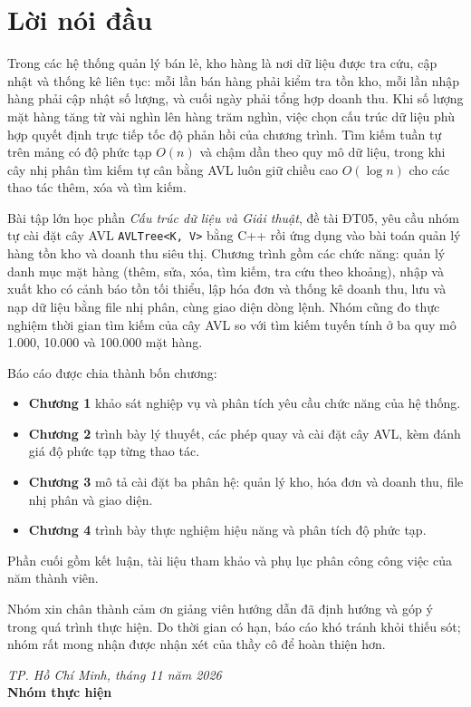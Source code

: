 \chapter*{Lời nói đầu}

Trong các hệ thống quản lý bán lẻ, kho hàng là nơi dữ liệu được tra cứu, cập nhật và thống kê liên tục: mỗi lần bán hàng phải kiểm tra tồn kho, mỗi lần nhập hàng phải cập nhật số lượng, và cuối ngày phải tổng hợp doanh thu. Khi số lượng mặt hàng tăng từ vài nghìn lên hàng trăm nghìn, việc chọn cấu trúc dữ liệu phù hợp quyết định trực tiếp tốc độ phản hồi của chương trình. Tìm kiếm tuần tự trên mảng có độ phức tạp $O(n)$ và chậm dần theo quy mô dữ liệu, trong khi cây nhị phân tìm kiếm tự cân bằng AVL luôn giữ chiều cao $O(\log n)$ cho các thao tác thêm, xóa và tìm kiếm.

Bài tập lớn học phần \textit{Cấu trúc dữ liệu và Giải thuật}, đề tài ĐT05, yêu cầu nhóm tự cài đặt cây AVL \texttt{AVLTree<K, V>} bằng C++ rồi ứng dụng vào bài toán quản lý hàng tồn kho và doanh thu siêu thị. Chương trình gồm các chức năng: quản lý danh mục mặt hàng (thêm, sửa, xóa, tìm kiếm, tra cứu theo khoảng), nhập và xuất kho có cảnh báo tồn tối thiểu, lập hóa đơn và thống kê doanh thu, lưu và nạp dữ liệu bằng file nhị phân, cùng giao diện dòng lệnh. Nhóm cũng đo thực nghiệm thời gian tìm kiếm của cây AVL so với tìm kiếm tuyến tính ở ba quy mô 1.000, 10.000 và 100.000 mặt hàng.

Báo cáo được chia thành bốn chương:
\begin{itemize}
  \item \textbf{Chương 1} khảo sát nghiệp vụ và phân tích yêu cầu chức năng của hệ thống.
  \item \textbf{Chương 2} trình bày lý thuyết, các phép quay và cài đặt cây AVL, kèm đánh giá độ phức tạp từng thao tác.
  \item \textbf{Chương 3} mô tả cài đặt ba phân hệ: quản lý kho, hóa đơn và doanh thu, file nhị phân và giao diện.
  \item \textbf{Chương 4} trình bày thực nghiệm hiệu năng và phân tích độ phức tạp.
\end{itemize}
Phần cuối gồm kết luận, tài liệu tham khảo và phụ lục phân công công việc của năm thành viên.

Nhóm xin chân thành cảm ơn giảng viên hướng dẫn đã định hướng và góp ý trong quá trình thực hiện. Do thời gian có hạn, báo cáo khó tránh khỏi thiếu sót; nhóm rất mong nhận được nhận xét của thầy cô để hoàn thiện hơn.

\begin{flushright}
\textit{TP. Hồ Chí Minh, tháng 11 năm 2026}\\
\textbf{Nhóm thực hiện}
\end{flushright}
